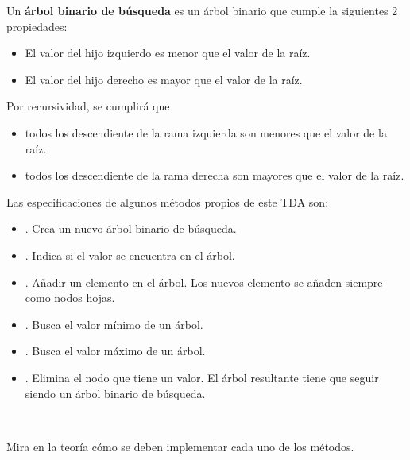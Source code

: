 
\begin{definicion}{}  \label{def:arbolBinarioBusqueda}
Un \textbf{árbol binario de búsqueda} es un árbol binario que cumple la siguientes 2 propiedades:
\begin{itemize}
\item El valor del hijo izquierdo es menor que el valor de la raíz.
\item El valor del hijo derecho es mayor que el valor de la raíz.
\end{itemize}

Por recursividad, se cumplirá que
\begin{itemize}
\item todos los descendiente de la rama izquierda son menores que el valor de la raíz.
\item todos los descendiente de la rama derecha son mayores que el valor de la raíz.
\end{itemize}


\noindent Las especificaciones de algunos métodos propios de este TDA son:


\begin{itemize}
\item {}. Crea un nuevo árbol binario de búsqueda.

\item {}. Indica si el valor se encuentra en el árbol.

\item {}. Añadir un elemento en el árbol. Los nuevos elemento se añaden siempre como nodos hojas. 

\item {}. Busca el valor mínimo de un árbol.

\item {}. Busca el valor máximo de un árbol.

\item {}. Elimina el nodo que tiene un valor. El árbol resultante tiene que seguir siendo un árbol binario de búsqueda.
\end{itemize}

\

Mira en la teoría cómo se deben implementar cada uno de los métodos.

\end{definicion}

